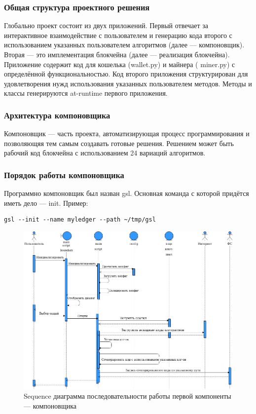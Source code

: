\subsubsection{Общая структура проектного решения}
Глобально проект состоит из двух приложений. Первый отвечает за интерактивное
взаимодействие с пользователем и генерацию кода второго с
использованием указанных пользователем алгоритмов (далее --- компоновщик).
Вторая --- это имплементация блокчейна (далее --- реализация блокчейна).
Приложение содержит код для кошелька ({\small wallet.py}) и майнера ({\small
miner.py}) с определённой функциональностью. Код второго приложения
структурирован для удовлетворения нужд использования указанных пользователем
методов. Методы и классы генерируются at-runtime первого приложения.



\subsubsection{Архитектура компоновщика}
Компоновщик --- часть проекта, автоматизирующая процесс программирования и
позволяющяя тем самым создавать готовые решения. Решением может быть рабочий
код блокчейна с использованием 24 вариаций алгоритмов.

\subsubsection{Порядок работы компоновщика}
Программно компоновщик был назван {\small gsl}. Основная команда с которой
придётся иметь дело --- init. Пример:\\

\begin{center}
\begin{Verbatim}[frame=single]
gsl --init --name myledger --path ~/tmp/gsl
\end{Verbatim}
\end{center}

\begin{figure}[h]
    \centering
    \includegraphics[width=\textwidth]{images/sequence}
    \caption{Sequence диаграмма последовательности работы первой компоненты --- компоновщика}\label{sequence}
\end{figure}

